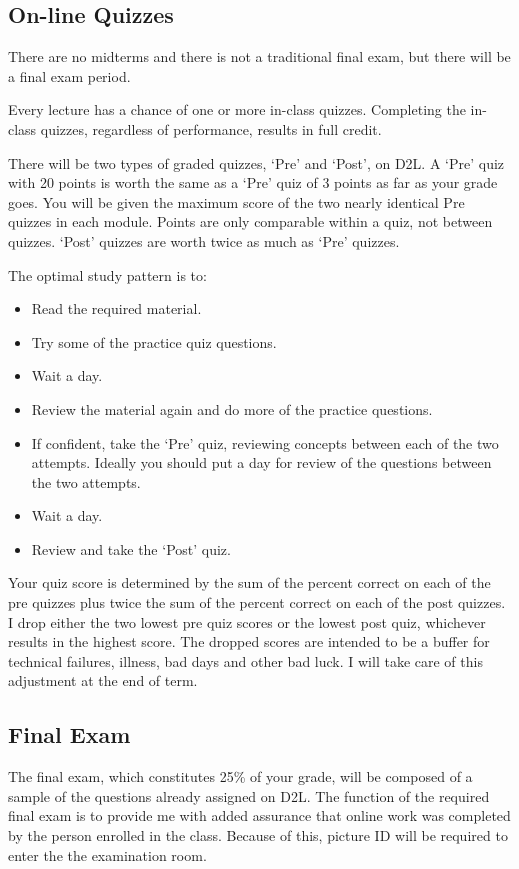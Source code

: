 \documentclass[letterpaper,10pt]{article}
\begin{document}
\subsection{On-line Quizzes}

 There are no midterms and there is
 not a traditional final exam, but there will be a final exam period.
 
 Every lecture has a chance of one or more in-class quizzes. Completing the
 in-class quizzes, regardless of performance, results in full credit.

There will be two types of graded quizzes, `Pre' and `Post', on D2L.  A `Pre'
quiz with 20 points is worth the same as a `Pre' quiz of 3 points as
far as your grade goes.  You will be given the maximum score of the two nearly identical Pre quizzes in each module. Points are only comparable within a quiz, not
between quizzes.  `Post' quizzes are worth twice as much as `Pre' quizzes.

The optimal study pattern is to:
\begin{itemize}
\item Read the required material.
\item Try some of the practice quiz questions.
\item Wait a day.
\item Review the material again and do more of the practice questions.
\item If confident, take the `Pre' quiz, reviewing concepts between each of the two attempts. Ideally you should put a day for review of the questions between the two attempts.
\item Wait a day.
\item Review and take the `Post' quiz.
\end{itemize}

Your quiz score is determined by the sum of the percent correct on each of the pre quizzes plus twice the sum of the percent correct on each of the post quizzes. I drop either the two lowest pre quiz scores or the lowest post quiz, whichever results in the highest score. 
The dropped scores are intended to be a buffer for technical
failures, illness, bad days and other bad luck.  I will take care of this adjustment at the end of term.  

\subsection{Final Exam}

The final exam, which constitutes 25\% of your grade, will be composed of a sample of the questions already assigned on D2L. The function of the required final exam is to provide me with added assurance that online work was completed by the person enrolled in the class.  Because of this, picture ID will be required to enter the the examination room.  
\end{document}
